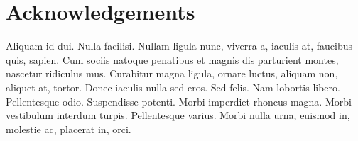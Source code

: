 \chapter*{Acknowledgements}

Aliquam id dui. Nulla facilisi. Nullam ligula nunc, viverra a, iaculis
at, faucibus quis, sapien. Cum sociis natoque penatibus et magnis dis
parturient montes, nascetur ridiculus mus. Curabitur magna ligula,
ornare luctus, aliquam non, aliquet at, tortor. Donec iaculis nulla
sed eros. Sed felis. Nam lobortis libero. Pellentesque
odio. Suspendisse potenti. Morbi imperdiet rhoncus magna. Morbi
vestibulum interdum turpis. Pellentesque varius. Morbi nulla urna,
euismod in, molestie ac, placerat in, orci. 


\vspace{10mm}

